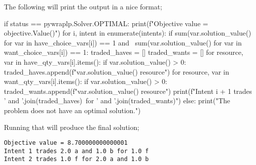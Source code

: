 The following will print the output in a nice format;

\begin{betterpython}
if status == pywraplp.Solver.OPTIMAL:
    print(f"Objective value = {objective.Value()}")
    for i, intent in enumerate(intents):
        if sum(var.solution_value() for var in have_choice_vars[i]) == 1 and \
             sum(var.solution_value() for var in want_choice_vars[i]) == 1:
            traded_haves = []
            traded_wants = []
            for resource, var in have_qty_vars[i].items():
                if var.solution_value() > 0:
                    traded_haves.append(f"{var.solution_value()} {resource}")
            for resource, var in want_qty_vars[i].items():
                if var.solution_value() > 0:
                    traded_wants.append(f"{var.solution_value()} {resource}")
            print(f"Intent {i + 1} trades {' and '.join(traded_haves)}\
                    for {' and '.join(traded_wants)}")
else:
    print("The problem does not have an optimal solution.")
\end{betterpython}

Running that will produce the final solution;

\begin{lstlisting}
Objective value = 8.700000000000001
Intent 1 trades 2.0 a and 1.0 b for 1.0 f
Intent 2 trades 1.0 f for 2.0 a and 1.0 b
\end{lstlisting}